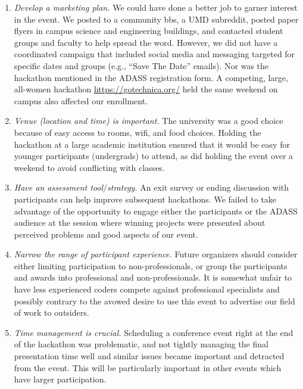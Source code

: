\documentclass[11pt,twoside]{article}
\begin{document}
{\begin{enumerate}
	\item \textit{Develop a marketing plan.} We could have done a better job to garner interest in the event. We posted to a community bbs, a UMD subreddit, posted paper flyers in campus science and engineering buildings, and contacted student groups and faculty to help spread the word. However, we did not have a coordinated campaign that included social media and messaging targeted for specific dates and groups (e.g., “Save The Date” emails). Nor was the hackathon mentioned in the ADASS registration form.  A competing, large, all-women hackathon \url{https://gotechnica.org/}  held the same weekend on campus also affected our enrollment.

	\item \textit{Venue (location and time) is important.} The university was a good choice because of easy access to rooms, wifi, and food choices. Holding the hackathon at a large academic institution ensured that it would be easy for younger participants (undergrads) to attend, as did holding the event over a weekend to avoid conflicting with classes.

	\item \textit{Have an assessment tool$\slash$strategy.} An exit survey or ending discussion with participants can help improve subsequent hackathons. We failed to take advantage of the opportunity to engage either the participants or the ADASS audience at the session where winning projects were presented about perceived problems and good aspects of our event.

	\item \textit{Narrow the range of participant experience.} Future organizers should consider either limiting participation to non-professionals, or group the participants and awards into professional and non-professionals.  It is somewhat unfair to have less experienced coders compete against professional specialists and possibly contrary to the avowed desire to use this event to advertise our field of work to outsiders.

	\item \textit{Time management is crucial.} Scheduling a conference event right at the end of the hackathon was problematic, and not tightly managing the final presentation time well and similar issues became important and detracted from the event. This will be particularly important in other events which have larger participation.

\end{enumerate}

}
\end{document}
